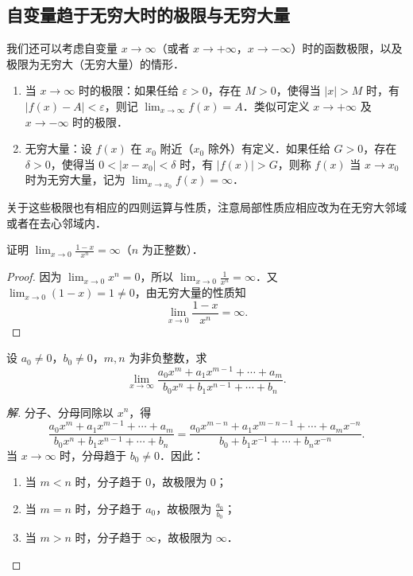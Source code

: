 \subsection*{自变量趋于无穷大时的极限与无穷大量}

我们还可以考虑自变量 $x \to \infty$（或者 $x \to +\infty$，$x \to -\infty$）时的函数极限，以及极限为无穷大（无穷大量）的情形．

\begin{enumerate}[label=(\arabic*)]
\item 当 $x \to \infty$ 时的极限：如果任给 $\varepsilon > 0$，存在 $M > 0$，使得当 $|x| > M$ 时，有 $|f(x) - A| < \varepsilon$，则记 $\lim_{x \to \infty} f(x) = A$．类似可定义 $x \to +\infty$ 及 $x \to -\infty$ 时的极限．
\item 无穷大量：设 $f(x)$ 在 $x_0$ 附近（$x_0$ 除外）有定义．如果任给 $G > 0$，存在 $\delta > 0$，使得当 $0 < |x - x_0| < \delta$ 时，有 $|f(x)| > G$，则称 $f(x)$ 当 $x \to x_0$ 时为无穷大量，记为 $\lim_{x \to x_0} f(x) = \infty$．
\end{enumerate}

关于这些极限也有相应的四则运算与性质，注意局部性质应相应改为在无穷大邻域或者在去心邻域内．

\begin{example}\label{ex:3-3-9}
证明 $\lim_{x \to 0} \frac{1-x}{x^n} = \infty$（$n$ 为正整数）．
\end{example}

\begin{proof}
因为 $\lim_{x \to 0} x^n = 0$，所以 $\lim_{x \to 0} \frac{1}{x^n} = \infty$．又 $\lim_{x \to 0} (1 - x) = 1 \neq 0$，由无穷大量的性质知
\[
\lim_{x \to 0} \frac{1-x}{x^n} = \infty.
\]
\end{proof}

\begin{example}\label{ex:3-3-10}
设 $a_0 \neq 0$，$b_0 \neq 0$，$m, n$ 为非负整数，求
\[
\lim_{x \to \infty} \frac{a_0 x^m + a_1 x^{m-1} + \cdots + a_m}{b_0 x^n + b_1 x^{n-1} + \cdots + b_n}.
\]
\end{example}

\begin{proof}[解]
分子、分母同除以 $x^n$，得
\[
\frac{a_0 x^m + a_1 x^{m-1} + \cdots + a_m}{b_0 x^n + b_1 x^{n-1} + \cdots + b_n} = \frac{a_0 x^{m-n} + a_1 x^{m-n-1} + \cdots + a_m x^{-n}}{b_0 + b_1 x^{-1} + \cdots + b_n x^{-n}}.
\]
当 $x \to \infty$ 时，分母趋于 $b_0 \neq 0$．因此：
\begin{enumerate}[label=(\arabic*)]
\item 当 $m < n$ 时，分子趋于 $0$，故极限为 $0$；
\item 当 $m = n$ 时，分子趋于 $a_0$，故极限为 $\frac{a_0}{b_0}$；
\item 当 $m > n$ 时，分子趋于 $\infty$，故极限为 $\infty$．
\end{enumerate}
\end{proof}

